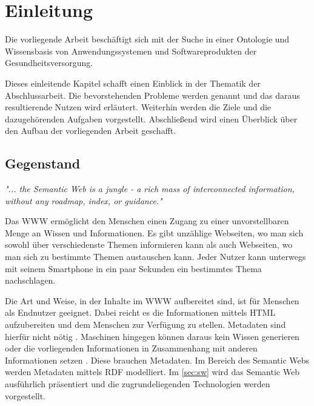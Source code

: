 \chapter{Einleitung}\label{ch:introduction}

Die vorliegende Arbeit beschäftigt sich mit der Suche in einer Ontologie und Wissensbasis von Anwendungssystemen und Softwareprodukten der Gesundheitsversorgung.

Dieses einleitende Kapitel schafft einen Einblick in der Thematik der Abschlussarbeit. 
Die bevorstehenden Probleme werden genannt und das daraus resultierende Nutzen wird erläutert. 
Weiterhin werden die Ziele und die dazugehörenden Aufgaben vorgestellt. 
Abschließend wird einen Überblick über den Aufbau der vorliegenden Arbeit geschafft.

\section{Gegenstand}\label{sec:gegenstand}

\begin{center}
\textit{"... the Semantic Web is a jungle - a rich mass of interconnected information, without any roadmap, index, or guidance."}
\end{center}

\begin{flushright}
\textit{ \textendash{} \citep{allemang}} \newline
\end{flushright}

Das \ac{WWW} ermöglicht den Menschen einen Zugang zu einer unvorstellbaren Menge an Wissen und Informationen. 
Es gibt unzählige Webseiten, wo man sich sowohl über verschiedenste Themen informieren kann als auch Webseiten, wo man sich zu bestimmte Themen austauschen kann. 
Jeder Nutzer kann unterwegs mit seinem Smartphone in ein paar Sekunden ein bestimmtes Thema nachschlagen. 

Die Art und Weise, in der Inhalte im \ac{WWW} aufbereitet sind, ist für Menschen als Endnutzer geeignet. 
Dabei reicht es die Informationen mittels \ac{HTML} aufzubereiten und dem Menschen zur Verfügung zu stellen. 
Metadaten sind hierfür nicht nötig \citep[vgl.]{pellegrinix}. 
Maschinen hingegen können daraus kein Wissen generieren oder die vorliegenden Informationen in Zusammenhang mit anderen Informationen setzen \citep[vgl.]{hitzler}. 
Diese brauchen Metadaten. 
Im Bereich des Semantic Webs werden Metadaten mittels \ac{RDF} modelliert. Im \cref{sec:sw} wird das Semantic Web ausführlich präsentiert und die zugrundeliegenden Technologien werden vorgestellt.

